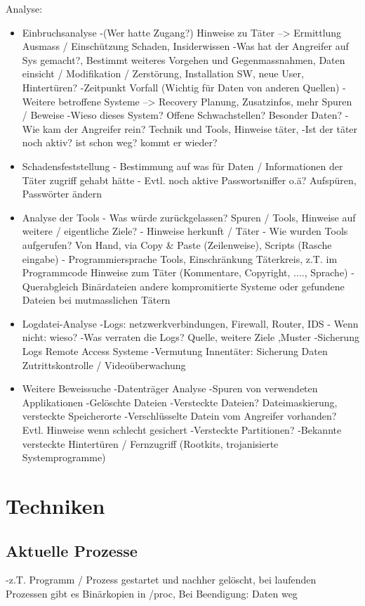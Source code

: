 Analyse:
\begin{itemize}
\item Einbruchsanalyse 
	-(Wer hatte Zugang?) Hinweise zu Täter --> Ermittlung Ausmass / Einschützung Schaden, Insiderwissen
	-Was hat der Angreifer auf Sys gemacht?, Bestimmt weiteres Vorgehen und Gegenmassnahmen, Daten einsicht / Modifikation / Zerstörung, Installation SW, neue User, Hintertüren?
	-Zeitpunkt Vorfall (Wichtig für Daten von anderen Quellen)
	-Weitere betroffene Systeme --> Recovery Planung, Zusatzinfos, mehr Spuren / Beweise
	-Wieso dieses System? Offene Schwachstellen? Besonder Daten?
	-Wie kam der Angreifer rein? Technik und Tools, Hinweise täter, 
	-Ist der täter noch aktiv? ist schon weg? kommt er wieder?
\item Schadensfeststellung
	- Bestimmung auf was für Daten / Informationen der Täter zugriff gehabt hätte
	- Evtl. noch aktive Passwortsniffer o.ä? Aufspüren, Passwörter ändern
\item Analyse der Tools
	- Was würde zurückgelassen? Spuren / Tools, Hinweise auf weitere / eigentliche Ziele?
	- Hinweise herkunft / Täter
	- Wie wurden Tools aufgerufen? Von Hand, via Copy \& Paste (Zeilenweise), Scripts (Rasche eingabe)
	- Programmiersprache Tools, Einschränkung Täterkreis, z.T. im Programmcode Hinweise zum Täter (Kommentare, Copyright, ...., Sprache)
	- Querabgleich Binärdateien andere kompromitierte Systeme oder gefundene Dateien bei mutmasslichen Tätern
\item Logdatei-Analyse
	-Logs: netzwerkverbindungen, Firewall, Router, IDS - Wenn nicht: wieso?
	-Was verraten die Logs? Quelle, weitere Ziele ,Muster
	-Sicherung Logs Remote Access Systeme
	-Vermutung Innentäter: Sicherung Daten Zutrittskontrolle / Videoüberwachung
\item Weitere Beweissuche
	-Datenträger Analyse
	-Spuren von verwendeten Applikationen
	-Gelöschte Dateien
	-Versteckte Dateien? Dateimaskierung, versteckte Speicherorte
	-Verschlüsselte Datein vom Angreifer vorhanden? Evtl. Hinweise wenn schlecht gesichert
	-Versteckte Partitionen?
	-Bekannte versteckte Hintertüren / Fernzugriff (Rootkits, trojanisierte Systemprogramme)
\end{itemize}

\section{Techniken}
\subsection{Aktuelle Prozesse}
-z.T. Programm / Prozess gestartet und nachher gelöscht, bei laufenden Prozessen gibt es Binärkopien in /proc, Bei Beendigung: Daten weg

